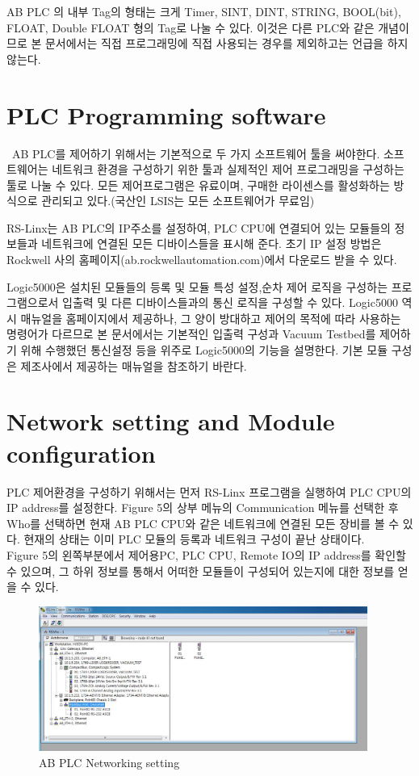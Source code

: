 \documentclass[11pt
  , a4paper
  , article
  , oneside
]{memoir}
\begin{document}
AB PLC 의 내부 Tag의 형태는 크게 Timer, SINT, DINT, STRING, BOOL(bit), FLOAT, Double FLOAT 형의 Tag로 나눌 수 있다. 이것은 다른 PLC와 같은 개념이므로 본 문서에서는 직접 프로그래밍에 직접 사용되는 경우를 제외하고는 언급을 하지 않는다.\

\newpage

 \section{PLC Programming software}\
AB PLC를 제어하기 위해서는 기본적으로 두 가지 소프트웨어 툴을 써야한다. 소프트웨어는 네트워크 환경을 구성하기 위한 툴과 실제적인 제어 프로그래밍을 구성하는 툴로 나눌 수 있다. 모든 제어프로그램은 유료이며, 구매한 라이센스를 활성화하는 방식으로 관리되고 있다.(국산인 LSIS는 모든 소프트웨어가 무료임)

RS-Linx는 AB PLC의 IP주소를 설정하여, PLC CPU에 연결되어 있는 모듈들의 정보들과 네트워크에 연결된 모든 디바이스들을 표시해 준다. 초기 IP 설정 방법은 Rockwell 사의 홈페이지(ab.rockwellautomation.com)에서 다운로드 받을 수 있다. 

Logic5000은 설치된 모듈들의 등록 및 모듈 특성 설정,순차 제어 로직을 구성하는 프로그램으로서 입출력 및 다른 디바이스들과의 통신 로직을 구성할 수 있다. Logic5000 역시 매뉴얼을 홈페이지에서 제공하나, 그 양이 방대하고 제어의 목적에 따라 사용하는 명령어가 다르므로 본 문서에서는 기본적인 입출력 구성과 Vacuum Testbed를 제어하기 위해 수행했던 통신설정 등을 위주로 Logic5000의 기능을 설명한다. 기본 모듈 구성은 제조사에서 제공하는 매뉴얼을 참조하기 바란다. 
  
  \section{Network setting and Module configuration}
 PLC 제어환경을 구성하기 위해서는 먼저 RS-Linx 프로그램을 실행하여 PLC CPU의 IP address를 설정한다. Figure 5의 상부 메뉴의 Communication 메뉴를 선택한 후 Who를 선택하면 현재 AB PLC CPU와 같은 네트워크에 연결된 모든 장비를 볼 수 있다. 현재의 상태는 이미 PLC 모듈의 등록과 네트워크 구성이 끝난 상태이다.\\ 
 
 Figure 5의 왼쪽부분에서 제어용PC, PLC CPU, Remote IO의 IP address를 확인할 수 있으며, 그 하위 정보를 통해서 어떠한 모듈들이 구성되어 있는지에 대한 정보를 얻을 수 있다.
 
 
 \begin{figure}[!htb]
 	\centering
 	\includegraphics[width=0.96\textwidth]{./picture/rslrinx.JPG}
 	\caption{
 		AB PLC Networking setting
 	}
 	\label{fig:}
 \end{figure}  
 
\end{document}
